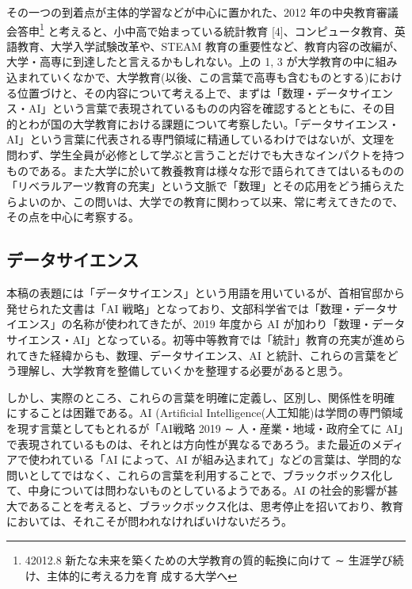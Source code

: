 \documentclass[
]{bxjsbook}
\theoremstyle{definition}
\theoremstyle{definition}
\theoremstyle{definition}
\theoremstyle{definition}
\theoremstyle{remark}
\begin{document}
その一つの到着点が主体的学習などが中心に置かれた、2012 年の中央教育審議会答申\footnote{42012.8 新たな未来を築くための大学教育の質的転換に向けて ∼ 生涯学び続け、主体的に考える力を育
  成する大学へ} と考えると、小中高で始まっている統計教育 {[}4{]}、コンピュータ教育、英語教育、大学入学試験改革や、STEAM 教育の重要性など、教育内容の改編が、大学・高専に到達したと言えるかもしれない。上の 1, 3 が大学教育の中に組み込まれていくなかで、大学教育(以後、この言葉で高専も含むものとする)における位置づけと、その内容について考える上で、まずは「数理・データサイエンス・AI」という言葉で表現されているものの内容を確認するとともに、その目的とわが国の大学教育における課題について考察したい。「データサイエンス・AI」という言葉に代表される専門領域に精通しているわけではないが、文理を問わず、学生全員が必修として学ぶと言うことだけでも大きなインパクトを持つものである。また大学に於いて教養教育は様々な形で語られてきてはいるものの「リベラルアーツ教育の充実」という文脈で「数理」とその応用をどう捕らえたらよいのか、この問いは、大学での教育に関わって以来、常に考えてきたので、その点を中心に考察する。

\hypertarget{ux30c7ux30fcux30bfux30b5ux30a4ux30a8ux30f3ux30b9}{%
\subsection{データサイエンス}\label{ux30c7ux30fcux30bfux30b5ux30a4ux30a8ux30f3ux30b9}}

本稿の表題には「データサイエンス」という用語を用いているが、首相官邸から発せられた文書は「AI 戦略」となっており、文部科学省では「数理・データサイエンス」の名称が使われてきたが、2019 年度から AI が加わり「数理・データサイエンス・AI」となっている。初等中等教育では「統計」教育の充実が進められてきた経緯からも、数理、データサイエンス、AI と統計、これらの言葉をどう理解し、大学教育を整備していくかを整理する必要があると思う。

しかし、実際のところ、これらの言葉を明確に定義し、区別し、関係性を明確にすることは困難である。AI (Artificial Intelligence(人工知能)は学問の専門領域を現す言葉としてもとれるが「AI戦略 2019 ∼ 人・産業・地域・政府全てに AI」で表現されているものは、それとは方向性が異なるであろう。また最近のメディアで使われている「AI によって、AI が組み込まれて」などの言葉は、学問的な問いとしてではなく、これらの言葉を利用することで、ブラックボックス化して、中身については問わないものとしているようである。AI の社会的影響が甚大であることを考えると、ブラックボックス化は、思考停止を招いており、教育においては、それこそが問われなければいけないだろう。
\end{document}
